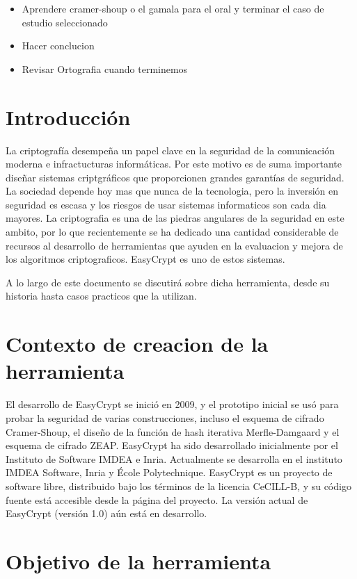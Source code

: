 \documentclass[runningheads,a4paper]{llncs}
\begin{document}
\begin{itemize}
	\item Aprendere cramer-shoup o el gamala para el oral y terminar el caso de estudio seleccionado
	\item Hacer conclucion
	\item Revisar Ortografia cuando terminemos
\end{itemize}

\section{Introducción}
La criptografía desempeña un papel clave en la seguridad de la comunicación moderna e infractucturas informáticas.  Por este motivo es de suma importante diseñar sistemas criptgráficos que proporcionen grandes garantías de seguridad.
La sociedad depende hoy mas que nunca de la tecnologia, pero la inversión en seguridad es escasa y los riesgos de usar sistemas informaticos son cada dia mayores. La criptografia es una de las piedras angulares de la seguridad en este  ambito, por lo que recientemente se ha dedicado una cantidad considerable de recursos al desarrollo de herramientas que ayuden en la evaluacion y mejora de los algoritmos criptograficos. EasyCrypt es uno de estos sistemas. 

    A lo largo de este documento se discutirá sobre dicha herramienta, desde su historia hasta casos practicos que la utilizan.
    
\section{Contexto de creacion de la herramienta}
El desarrollo de EasyCrypt se inició en 2009, y el prototipo inicial se usó para probar la seguridad de varias construcciones, incluso el esquema de cifrado Cramer-Shoup, el diseño de la función de hash iterativa Merfle-Damgaard y el esquema de cifrado ZEAP. EasyCrypt ha sido desarrollado inicialmente por el Instituto de Software IMDEA e Inria. Actualmente se desarrolla en el instituto IMDEA Software, Inria y École Polytechnique. EasyCrypt es un proyecto de software libre, distribuido bajo los términos de la licencia CeCILL-B, y su código fuente está accesible desde la página del proyecto. 
La versión actual de EasyCrypt (versión 1.0) aún está en desarrollo. 
\cite{article2}

\section{Objetivo de la herramienta} 
\end{document}
